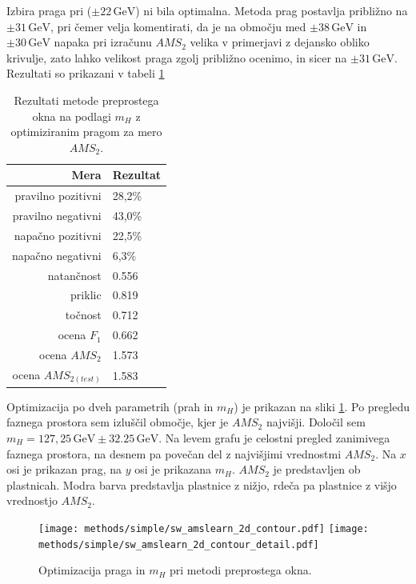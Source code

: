 \documentclass[11pt,a4paper,openany]{book}
\begin{document}
Izbira praga pri ($\pm 22\,\text{GeV}$) ni bila optimalna. Metoda prag postavlja približno na $\pm 31\,\text{GeV}$, pri čemer velja komentirati, da je na območju med $\pm 38\,\text{GeV}$ in $\pm 30\,\text{GeV}$ napaka pri izračunu $AMS_2$ velika v primerjavi z dejansko obliko krivulje, zato lahko velikost praga zgolj približno ocenimo, in sicer na $\pm 31\,\text{GeV}$. Rezultati so prikazani v tabeli \ref{tb:preprosto_okno_optimized}

\begin{table}[ht]
	\centering
	\begin{tabular}{rl}
		\hline
		\textbf{Mera} & \textbf{Rezultat} \\
		\hline
		pravilno pozitivni & 28,2\%\\
		pravilno negativni & 43,0\% \\
		napačno pozitivni & 22,5\% \\
		napačno negativni & 6,3\% \\
		natančnost & 0.556 \\
		priklic & 0.819 \\
		točnost & 0.712 \\
		ocena $F_1$ & 0.662 \\
		ocena $AMS_2$ & 1.573 \\
		ocena $AMS_{2(test)}$ & 1.583 		
	\end{tabular}
	\caption{Rezultati metode preprostega okna na podlagi $m_H$ z optimiziranim pragom za mero $AMS_2$.}
	\label{tb:preprosto_okno_optimized}
\end{table}

Optimizacija po dveh parametrih (prah in $m_H$) je prikazan na sliki \ref{sl:simple_optimization_2d}. Po pregledu faznega prostora sem izluščil območje, kjer je $AMS_2$ najvišji. Določil sem $m_H = 127,25\,\text{GeV} \pm 32.25\,\text{GeV}$. Na levem grafu je celostni pregled zanimivega faznega prostora, na desnem pa povečan del z najvišjimi vrednostmi $AMS_2$. Na $x$ osi je prikazan prag, na $y$ osi je prikazana $m_H$. $AMS_2$ je predstavljen ob plastnicah. Modra barva predstavlja plastnice z nižjo, rdeča pa plastnice z višjo vrednostjo $AMS_2$.

\begin{figure}[h]
	\centering	
	\texttt{[image: methods/simple/sw\_amslearn\_2d\_contour.pdf]}
	\texttt{[image: methods/simple/sw\_amslearn\_2d\_contour\_detail.pdf]}		
	
	\caption{Optimizacija praga in $m_H$ pri metodi preprostega okna.}
	\label{sl:simple_optimization_2d}
\end{figure}
\end{document}
